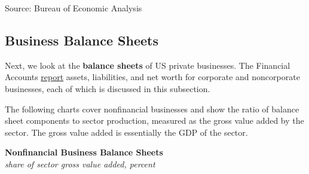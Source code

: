 \documentclass{report}
\makeatletter
\newcommand{\tbllink}[1]{\href{https://raw.githubusercontent.com/bdecon/US-chartbook/master/chartbook/data/#1}{\faTable}}
\newcommand*\short[1]{\expandafter\@gobbletwo\number\numexpr#1\relax}
\newcommand{\sbar}[4]{
		\addplot[ybar stacked, bar width=2.3pt, draw opacity=0, fill=#1] 
			table [x=#2, y=#3, col sep=comma]{#4};}
\newcommand{\dateaxisticks}{
		date coordinates in=x, axis line style={draw=none},
		xmax={2024-01-31},
		max space between ticks=40,	    
		xtick={{1990-01-01}, {1992-01-01}, {1994-01-01}, 
			{1996-01-01}, {1998-01-01}, {2000-01-01}, 
			{2002-01-01}, {2004-01-01}, {2006-01-01},
			{2008-01-01}, {2010-01-01}, {2012-01-01}, {2014-01-01},
		    {2016-01-01}, {2018-01-01}, {2020-01-01}, {2022-01-01}, 
		    {2024-01-01}, {2026-01-01}},
		minor xtick={{1989-01-01}, {1991-01-01}, {1993-01-01},
			{1995-01-01}, {1997-01-01}, {1999-01-01}, 
			{2001-01-01}, {2003-01-01}, {2005-01-01}, {2007-01-01},
		    {2009-01-01}, {2011-01-01}, {2013-01-01}, {2015-01-01},
		    {2017-01-01}, {2019-01-01}, {2021-01-01}, {2023-01-01}, 
		    {2025-01-01}, {2027-01-01}},
		enlarge y limits={0.06}, enlarge x limits={0.01},
		xticklabel style={align=center, yshift=-2pt}, tick label style={inner sep=0pt},
		}
\newcommand{\bbar}[2]{extra #1 ticks = {{#2}}, extra #1 tick labels = ,
		extra #1 tick style = {grid=major, grid style={thick, black!25}},}
\newcommand{\rbars}{
		\fill[color=black!10] (axis cs:{1990-07-01},\pgfkeysvalueof{/pgfplots/ymin})
			rectangle (axis cs:{1991-03-01}, \pgfkeysvalueof{/pgfplots/ymax});
		\fill[color=black!10] (axis cs:{2007-12-01},\pgfkeysvalueof{/pgfplots/ymin})
			rectangle (axis cs:{2009-07-01}, \pgfkeysvalueof{/pgfplots/ymax});
		\fill[color=black!10] (axis cs:{2001-03-01},\pgfkeysvalueof{/pgfplots/ymin})
			rectangle (axis cs:{2001-11-01}, \pgfkeysvalueof{/pgfplots/ymax});
		\fill[color=black!10] (axis cs:{2020-02-01},\pgfkeysvalueof{/pgfplots/ymin})
			rectangle (axis cs:{2020-05-01}, \pgfkeysvalueof{/pgfplots/ymax});}
\makeatother
\begin{document}
{\begin{minipage}{1.0\textwidth}
\hspace{3mm} 

\footnotesize{Source: Bureau of Economic Analysis} \hfill \tbllink{cprof2.csv}
\end{minipage}
\newpage
\vspace*{-10mm}

\hypertarget{busbs}{\label{busbs}}
\begin{minipage}{1.0\textwidth}      
\subsection*{Business Balance Sheets}

\small Next, we look at the \textbf{balance sheets} of US private businesses. The Financial Accounts \href{https://www.federalreserve.gov/releases/z1/}{report} assets, liabilities, and net worth for corporate and noncorporate businesses, each of which is discussed in this subsection. 

The following charts cover nonfinancial businesses and show the ratio of balance sheet components to sector production, measured as the gross value added by the sector. The gross value added is essentially the GDP of the sector. 
\vspace{1mm}

\normalsize \textbf{Nonfinancial Business Balance Sheets}\\
\footnotesize{\textit{share of sector gross value added, percent}}
\end{minipage}
\vspace{2.8cm}

}
\end{document}
